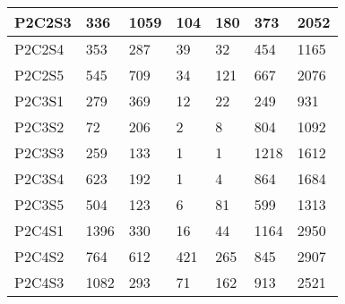 \begin{longtable}{lllllll}
\multicolumn{1}{|l|}{P2C2S3} & \multicolumn{1}{l|}{336} & \multicolumn{1}{l|}{1059} & \multicolumn{1}{l|}{104} & \multicolumn{1}{l|}{180} & \multicolumn{1}{l|}{373} & \multicolumn{1}{l|}{2052} \\ \hline
\multicolumn{1}{|l|}{P2C2S4} & \multicolumn{1}{l|}{353} & \multicolumn{1}{l|}{287} & \multicolumn{1}{l|}{39} & \multicolumn{1}{l|}{32} & \multicolumn{1}{l|}{454} & \multicolumn{1}{l|}{1165} \\ \hline
\multicolumn{1}{|l|}{P2C2S5} & \multicolumn{1}{l|}{545} & \multicolumn{1}{l|}{709} & \multicolumn{1}{l|}{34} & \multicolumn{1}{l|}{121} & \multicolumn{1}{l|}{667} & \multicolumn{1}{l|}{2076} \\ \hline
\multicolumn{1}{|l|}{P2C3S1} & \multicolumn{1}{l|}{279} & \multicolumn{1}{l|}{369} & \multicolumn{1}{l|}{12} & \multicolumn{1}{l|}{22} & \multicolumn{1}{l|}{249} & \multicolumn{1}{l|}{931} \\ \hline
\multicolumn{1}{|l|}{P2C3S2} & \multicolumn{1}{l|}{72} & \multicolumn{1}{l|}{206} & \multicolumn{1}{l|}{2} & \multicolumn{1}{l|}{8} & \multicolumn{1}{l|}{804} & \multicolumn{1}{l|}{1092} \\ \hline
\multicolumn{1}{|l|}{P2C3S3} & \multicolumn{1}{l|}{259} & \multicolumn{1}{l|}{133} & \multicolumn{1}{l|}{1} & \multicolumn{1}{l|}{1} & \multicolumn{1}{l|}{1218} & \multicolumn{1}{l|}{1612} \\ \hline
\multicolumn{1}{|l|}{P2C3S4} & \multicolumn{1}{l|}{623} & \multicolumn{1}{l|}{192} & \multicolumn{1}{l|}{1} & \multicolumn{1}{l|}{4} & \multicolumn{1}{l|}{864} & \multicolumn{1}{l|}{1684} \\ \hline
\multicolumn{1}{|l|}{P2C3S5} & \multicolumn{1}{l|}{504} & \multicolumn{1}{l|}{123} & \multicolumn{1}{l|}{6} & \multicolumn{1}{l|}{81} & \multicolumn{1}{l|}{599} & \multicolumn{1}{l|}{1313} \\ \hline
\multicolumn{1}{|l|}{P2C4S1} & \multicolumn{1}{l|}{1396} & \multicolumn{1}{l|}{330} & \multicolumn{1}{l|}{16} & \multicolumn{1}{l|}{44} & \multicolumn{1}{l|}{1164} & \multicolumn{1}{l|}{2950} \\ \hline
\multicolumn{1}{|l|}{P2C4S2} & \multicolumn{1}{l|}{764} & \multicolumn{1}{l|}{612} & \multicolumn{1}{l|}{421} & \multicolumn{1}{l|}{265} & \multicolumn{1}{l|}{845} & \multicolumn{1}{l|}{2907} \\ \hline
\multicolumn{1}{|l|}{P2C4S3} & \multicolumn{1}{l|}{1082} & \multicolumn{1}{l|}{293} & \multicolumn{1}{l|}{71} & \multicolumn{1}{l|}{162} & \multicolumn{1}{l|}{913} & \multicolumn{1}{l|}{2521} \\ \hline

\end{longtable}
